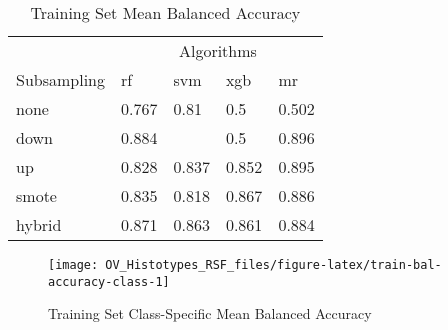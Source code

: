 \documentclass[
]{report}
\begin{document}
\begin{table}

\caption{\label{tab:train-bal-accuracy-table}Training Set Mean Balanced Accuracy}
\centering
\begin{tabular}[t]{l|l|l|l|l}
\hline
\multicolumn{1}{c|}{ } & \multicolumn{4}{c}{Algorithms} \\
\cline{2-5}
Subsampling & rf & svm & xgb & mr\\
\hline
none & 0.767 & 0.81 & 0.5 & 0.502\\
\hline
down & 0.884 & \cellcolor[HTML]{90ee90}{0.897} & 0.5 & 0.896\\
\hline
up & 0.828 & 0.837 & 0.852 & 0.895\\
\hline
smote & 0.835 & 0.818 & 0.867 & 0.886\\
\hline
hybrid & 0.871 & 0.863 & 0.861 & 0.884\\
\hline
\end{tabular}
\end{table}

\begin{figure}[H]

{\centering \texttt{[image: OV\_Histotypes\_RSF\_files/figure-latex/train-bal-accuracy-class-1]} 

}

\caption{Training Set Class-Specific Mean Balanced Accuracy}\label{fig:train-bal-accuracy-class}
\end{figure}
\end{document}
